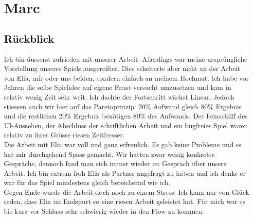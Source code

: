 \chapter{Marc}

\section{Rückblick}
Ich bin äusserst zufrieden mit unserer Arbeit.
Allerdings war meine ursprüngliche Vorstellung unseres Spiels ausgereifter.
Dies scheiterte aber nicht an der Arbeit von Elia, mir oder uns beiden, sondern einfach an meinem Hochmut.
Ich habe vor Jahren die selbe Spielidee auf eigene Faust versucht umzusetzen und kam in relativ wenig Zeit sehr weit.
Ich dachte der Fortschritt wächst Linear.
Jedoch stiessen auch wir hier auf das Paretoprinzip: 20\% Aufwand gleich 80\% Ergebnis und die restlichen 20\% Ergebnis benötigen 80\% des Aufwands.
Der Feinschliff des UI-Aussehen, der Abschluss der schriftlichen Arbeit und ein bugfreies Spiel waren relativ zu ihrer Grösse riesen Zeitfresser. \\
Die Arbeit mit Elia war voll und ganz erfreulich.
Es gab keine Probleme und es hat mir durchgehend Spass gemacht.
Wir hatten zwar wenig konkrette Gespräche, dennoch fand man sich immer wieder im Gespräch über unsere Arbeit.
Ich bin extrem froh Elia als Partner angefragt zu haben und ich denke er war für das Spiel mindestens gleich bereichernd wie ich. \\
Gegen Ende wurde die Arbeit doch noch zu einem Stress.
Ich kann nur von Glück reden, dass Elia im Endspurt so eine riesen Arbeit geleistet hat.
Für mich war es bis kurz vor Schluss sehr schwierig wieder in den Flow zu kommen.

